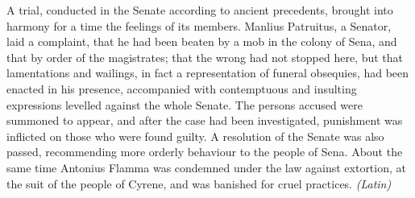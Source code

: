 
A trial, conducted in the Senate according to ancient precedents, brought into harmony for a time the feelings of its members. Manlius Patruitus, a Senator, laid a complaint, that he had been beaten by a mob in the colony of Sena, and that by order of the magistrates; that the wrong had not stopped here, but that lamentations and wailings, in fact a representation of funeral obsequies, had been enacted in his presence, accompanied with contemptuous and insulting expressions levelled against the whole Senate. The persons accused were summoned to appear, and after the case had been investigated, punishment was inflicted on those who were found guilty. A resolution of the Senate was also passed, recommending more orderly behaviour to the people of Sena. About the same time Antonius Flamma was condemned under the law against extortion, at the suit of the people of Cyrene, and was banished for cruel practices. \emph{(Latin)}


